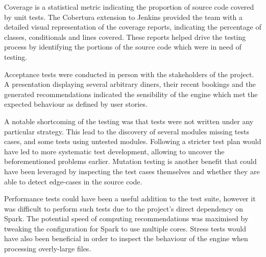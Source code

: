 \documentclass{l3proj}
\begin{document}
Coverage is a statistical metric indicating the proportion of source code covered by unit tests. 
The Cobertura extension to Jenkins provided the team with a detailed visual representation of the coverage reports, indicating the percentage of classes, conditionals and lines covered. These reports helped drive the testing process by identifying the portions of the source code which were in need of testing.

Acceptance tests were conducted in person with the stakeholders of the project. A presentation displaying several arbitrary diners, their recent bookings and the generated recommendations indicated the sensibility of the engine which met the expected behaviour as defined by user stories.

A notable shortcoming of the testing was that tests were not written under any particular strategy. This lead to the discovery of several modules missing tests cases, and some tests using untested modules. Following a stricter test plan would have led to more systematic test development, allowing to uncover the beforementioned problems earlier. Mutation testing is another benefit that could have been leveraged by inspecting the test cases themselves and whether they are able to detect edge-cases in the source code.

Performance tests could have been a useful addition to the test suite, however it was difficult to perform such tests due to the project's direct dependency on Spark. The potential speed of computing recommendations was maximised by tweaking the configuration for Spark to use multiple cores. Stress tests would have also been beneficial in order to inspect the behaviour of the engine when processing overly-large files.
\end{document}
